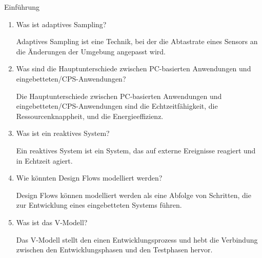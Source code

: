 \documentclass{article}
\begin{document}
\begin{exercise}{Einführung}
\begin{enumerate}
    \item Was ist adaptives Sampling?

          \begin{solution}
            Adaptives Sampling ist eine Technik, bei der die Abtastrate eines Sensors an die Änderungen der Umgebung angepasst wird.
          \end{solution}

    \item Was sind die Hauptunterschiede zwischen PC-basierten Anwendungen und eingebetteten/CPS-Anwendungen?

          \begin{solution}
            Die Hauptunterschiede zwischen PC-basierten Anwendungen und eingebetteten/CPS-Anwendungen sind die Echtzeitfähigkeit, die Ressourcenknappheit, und die Energieeffizienz.
          \end{solution}

    \item Was ist ein reaktives System?

          \begin{solution}
            Ein reaktives System ist ein System, das auf externe Ereignisse reagiert und in Echtzeit agiert.
          \end{solution}

    \item Wie könnten Design Flows modelliert werden?

          \begin{solution}
            Design Flows können modelliert werden als eine Abfolge von Schritten, die zur Entwicklung eines eingebetteten Systems führen.
          \end{solution}

    \item Was ist das V-Modell?

          \begin{solution}
            Das V-Modell stellt den einen Entwicklungsprozess und hebt die Verbindung zwischen den Entwicklungsphasen und den Testphasen hervor.
          \end{solution}
  \end{enumerate}
\end{exercise}
\end{document}
